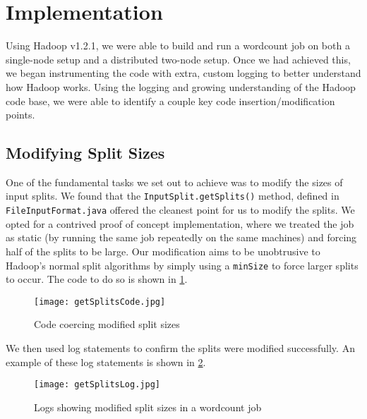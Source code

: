 \section{Implementation}
\label{section:implementation}
Using Hadoop v1.2.1, we were able to build and run a wordcount job
on both a single-node setup and a distributed two-node setup. Once
we had achieved this, we began instrumenting the code with extra,
custom logging to better understand how Hadoop works. Using the
logging and growing understanding of the Hadoop code base, we were
able to identify a couple key code insertion/modification points.

\subsection{Modifying Split Sizes}
One of the fundamental tasks we set out to achieve was to modify the
sizes of input splits. We found that the \texttt{InputSplit.getSplits()}
method, defined in \texttt{FileInputFormat.java} offered the cleanest
point for us to modify the splits. We opted for a contrived proof of
concept implementation, where we treated the job as static (by running
the same job repeatedly on the same machines) and forcing half of the
splits to be large. Our modification aims to be unobtrusive to Hadoop's
normal split algorithms by simply using a \texttt{minSize} to force larger
splits to occur. The code to do so is shown in \ref{fig:getSplitsCode}.

\begin{figure}[ht!]
\centering
\texttt{[image: getSplitsCode.jpg]}
\caption{Code coercing modified split sizes}
\label{fig:getSplitsCode}
\end{figure}

We then used log statements to confirm the splits were modified successfully.
An example of these log statements is shown in \ref{fig:getSplitsLog}.

\begin{figure}[ht!]
\centering
\texttt{[image: getSplitsLog.jpg]}
\caption{Logs showing modified split sizes in a wordcount job}
\label{fig:getSplitsLog}
\end{figure}

